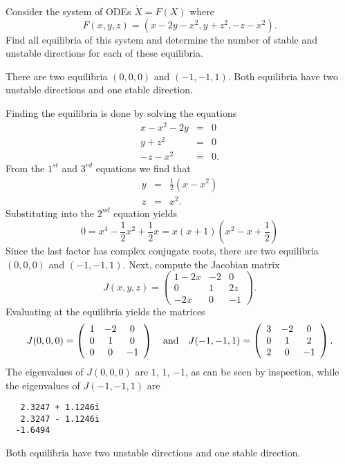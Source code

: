 \documentclass{ximera}
\begin{document}
\begin{exercise} \label{c14.2.1F}
Consider the system of ODEs $\dot{X}=F(X)$ where
\[
F(x,y,z) = (x - 2y - x^2, y + z^2, -z - x^2).
\]
Find all equilibria of this system and determine the number of stable and 
unstable directions for each of these equilibria.

\begin{solution}
\ans There are two equilibria $(0,0,0)$ and $(-1,-1,1)$.
Both equilibria have two unstable directions and one stable direction.

\soln  Finding the equilibria is done by solving the equations
\begin{eqnarray*}
x - x^2 - 2y & = & 0 \\
y + z^2 & = & 0 \\
-z - x^2 & = & 0.
\end{eqnarray*}
From the $1^{st}$ and $3^{rd}$ equations we find that
\begin{eqnarray*}
 y & = & \frac{1}{2}(x-x^2)\\
 z & = & x^2.
\end{eqnarray*}
Substituting into the $2^{nd}$ equation yields
\[
 0 = x^4 - \frac{1}{2}x^2 + \frac{1}{2}x = x(x+1)(x^2-x+\frac{1}{2})
\]
Since the last factor has complex conjugate roots, there are two equilibria
$(0,0,0)$ and $(-1,-1,1)$.  Next, compute the Jacobian matrix
\[
J(x,y,z) = \left(\begin{array}{ccc}
1-2x & -2 & 0\\ 0 & 1 & 2z\\ -2x & 0 & -1 \end{array}\right).
\]
Evaluating at the equilibria yields the matrices
\[
J(0,0,0) = \left(\begin{array}{ccc}
1 & -2 & 0\\ 0 & 1 & 0\\ 0 & 0 & -1 \end{array}\right)
\quad\mbox{and}\quad 
J(-1,-1,1) = \left(\begin{array}{ccc}
3 & -2 & 0\\ 0 & 1 & 2\\ 2 & 0 & -1 \end{array}\right).
\]
The eigenvalues of $J(0,0,0)$ are $1$, $1$, $-1$, as can be seen by
inspection, while the eigenvalues of $J(-1,-1,1)$ are
\begin{verbatim}
   2.3247 + 1.1246i
   2.3247 - 1.1246i
  -1.6494     
\end{verbatim}
Both equilibria have two unstable directions and one stable direction.




\end{solution}
\end{exercise}
\end{document}
